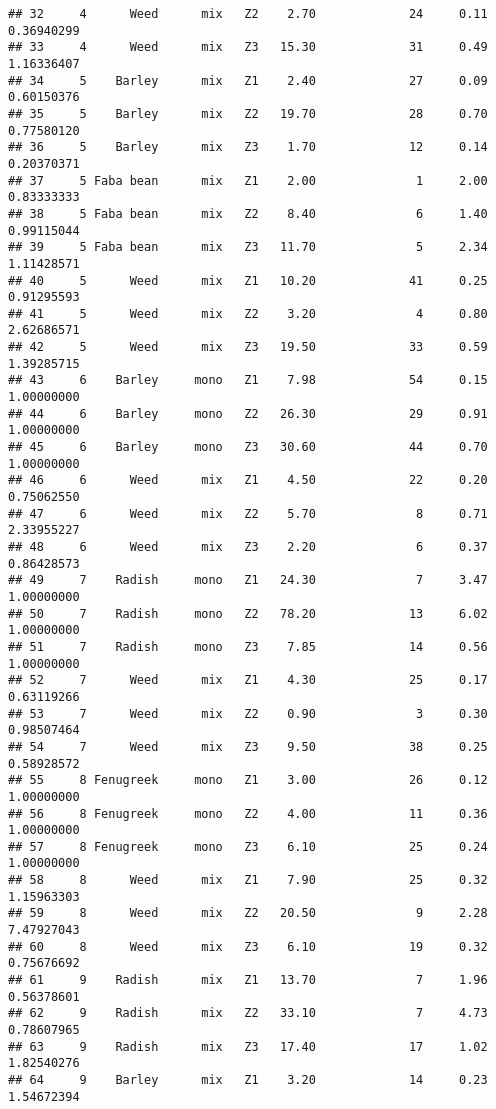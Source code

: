 \documentclass[
]{article}
\begin{document}
\begin{verbatim}
## 32     4      Weed      mix   Z2    2.70             24     0.11  0.36940299
## 33     4      Weed      mix   Z3   15.30             31     0.49  1.16336407
## 34     5    Barley      mix   Z1    2.40             27     0.09  0.60150376
## 35     5    Barley      mix   Z2   19.70             28     0.70  0.77580120
## 36     5    Barley      mix   Z3    1.70             12     0.14  0.20370371
## 37     5 Faba bean      mix   Z1    2.00              1     2.00  0.83333333
## 38     5 Faba bean      mix   Z2    8.40              6     1.40  0.99115044
## 39     5 Faba bean      mix   Z3   11.70              5     2.34  1.11428571
## 40     5      Weed      mix   Z1   10.20             41     0.25  0.91295593
## 41     5      Weed      mix   Z2    3.20              4     0.80  2.62686571
## 42     5      Weed      mix   Z3   19.50             33     0.59  1.39285715
## 43     6    Barley     mono   Z1    7.98             54     0.15  1.00000000
## 44     6    Barley     mono   Z2   26.30             29     0.91  1.00000000
## 45     6    Barley     mono   Z3   30.60             44     0.70  1.00000000
## 46     6      Weed      mix   Z1    4.50             22     0.20  0.75062550
## 47     6      Weed      mix   Z2    5.70              8     0.71  2.33955227
## 48     6      Weed      mix   Z3    2.20              6     0.37  0.86428573
## 49     7    Radish     mono   Z1   24.30              7     3.47  1.00000000
## 50     7    Radish     mono   Z2   78.20             13     6.02  1.00000000
## 51     7    Radish     mono   Z3    7.85             14     0.56  1.00000000
## 52     7      Weed      mix   Z1    4.30             25     0.17  0.63119266
## 53     7      Weed      mix   Z2    0.90              3     0.30  0.98507464
## 54     7      Weed      mix   Z3    9.50             38     0.25  0.58928572
## 55     8 Fenugreek     mono   Z1    3.00             26     0.12  1.00000000
## 56     8 Fenugreek     mono   Z2    4.00             11     0.36  1.00000000
## 57     8 Fenugreek     mono   Z3    6.10             25     0.24  1.00000000
## 58     8      Weed      mix   Z1    7.90             25     0.32  1.15963303
## 59     8      Weed      mix   Z2   20.50              9     2.28  7.47927043
## 60     8      Weed      mix   Z3    6.10             19     0.32  0.75676692
## 61     9    Radish      mix   Z1   13.70              7     1.96  0.56378601
## 62     9    Radish      mix   Z2   33.10              7     4.73  0.78607965
## 63     9    Radish      mix   Z3   17.40             17     1.02  1.82540276
## 64     9    Barley      mix   Z1    3.20             14     0.23  1.54672394

\end{verbatim}
\end{document}
